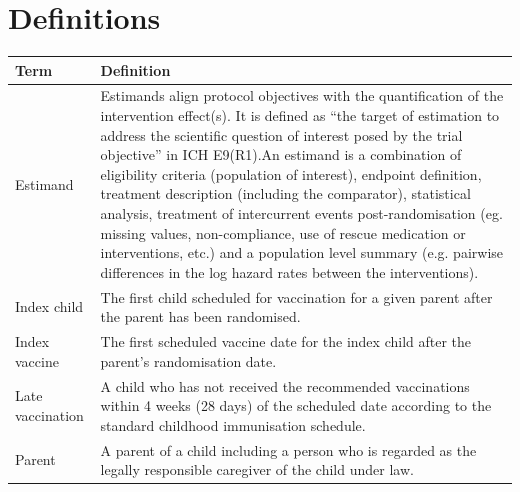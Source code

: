 \documentclass[
  bibliography=totoc]{scrreprt}
\begin{document}
\begin{versionhistory}
  \end{versionhistory}

{
    \setcounter{tocdepth}{1}
  \tableofcontents
}




\hypertarget{definitions}{%
\chapter{Definitions}\label{definitions}}

\begin{table}[H]
\centering\begingroup\fontsize{10}{12}\selectfont

\begin{tabular}{l>{\raggedright\arraybackslash}p{25em}}
\toprule
Term & Definition\\
\midrule
Estimand & Estimands align protocol objectives with the quantification of the intervention effect(s). \newline     It is defined as “the target of estimation to address the scientific question of interest posed by the trial objective” in ICH E9(R1).\newline \newline     An estimand is a combination of eligibility criteria (population of interest), endpoint definition, treatment description (including the comparator), statistical analysis, treatment of intercurrent events post-randomisation (eg. missing values, non-compliance, use of rescue medication or interventions, etc.) and a population level summary (e.g. pairwise differences in the log hazard rates between the interventions).\newline \\
Index child & The first child scheduled for vaccination for a given parent after the parent has been randomised.\newline \\
Index vaccine & The first scheduled vaccine date for the index child after the parent’s randomisation date.\newline \\
Late vaccination & A child who has not received the recommended vaccinations within 4 weeks (28 days) of the scheduled date according to the standard childhood immunisation schedule.\newline \\
Parent & A parent of a child including a person who is regarded as the legally responsible caregiver of the child under law.\newline \\

\end{tabular}
\end{table}
\end{document}
